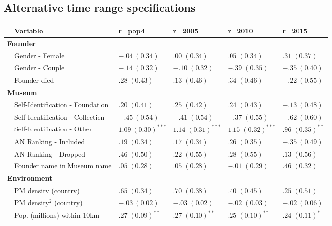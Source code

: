 \documentclass[12pt]{article}
\begin{document}
\subsection*{Alternative time range specifications}
\label{sec:org68f7010}
\begin{table}[ht]
\centering
\begin{tabular}{p{0mm}lllll}
  \hline 
 \multicolumn{1}{l}{} & \multicolumn{1}{l}{Variable} & \multicolumn{1}{l}{r\_pop4} & \multicolumn{1}{l}{r\_2005} & \multicolumn{1}{l}{r\_2010} & \multicolumn{1}{l}{r\_2015}\\ 
 \hline
  \multicolumn{6}{l}{\textbf{Founder}} \\ 
 & Gender - Female & $-.04 \; (0.34)$ & $.00 \; (0.34)$ & $.05 \; (0.34)$ & $.31 \; (0.37)$ \\ 
   & Gender - Couple & $-.14 \; (0.32)$ & $-.10 \; (0.32)$ & $-.39 \; (0.35)$ & $-.35 \; (0.40)$ \\ 
   & Founder died & $.28 \; (0.43)$ & $.13 \; (0.46)$ & $.34 \; (0.46)$ & $-.22 \; (0.55)$ \\ 
   \multicolumn{6}{l}{\textbf{Museum}} \\ 
 & Self-Identification - Foundation & $.20 \; (0.41)$ & $.25 \; (0.42)$ & $.24 \; (0.43)$ & $-.13 \; (0.48)$ \\ 
   & Self-Identification - Collection & $-.45 \; (0.54)$ & $-.41 \; (0.54)$ & $-.37 \; (0.55)$ & $-.62 \; (0.60)$ \\ 
   & Self-Identification - Other & $1.09 \; (0.30)^{***}$ & $1.14 \; (0.31)^{***}$ & $1.15 \; (0.32)^{***}$ & $.96 \; (0.35)^{**}$ \\ 
   & AN Ranking - Included & $.19 \; (0.34)$ & $.17 \; (0.34)$ & $.26 \; (0.35)$ & $-.35 \; (0.49)$ \\ 
   & AN Ranking - Dropped & $.46 \; (0.50)$ & $.22 \; (0.55)$ & $.28 \; (0.55)$ & $.13 \; (0.56)$ \\ 
   & Founder name in Museum name & $.05 \; (0.28)$ & $.05 \; (0.28)$ & $-.01 \; (0.29)$ & $.46 \; (0.32)$ \\ 
   \multicolumn{6}{l}{\textbf{Environment}} \\ 
 & PM density (country) & $.65 \; (0.34)$ & $.70 \; (0.38)$ & $.40 \; (0.45)$ & $.25 \; (0.51)$ \\ 
   & PM density$^{2}$ (country) & $-.03 \; (0.02)$ & $-.03 \; (0.02)$ & $-.02 \; (0.03)$ & $-.02 \; (0.06)$ \\ 
   & Pop. (millions) within 10km & $.27 \; (0.09)^{**}$ & $.27 \; (0.10)^{**}$ & $.25 \; (0.10)^{**}$ & $.24 \; (0.11)^{*}$ \\ 

\end{tabular}
\end{table}
\end{document}

